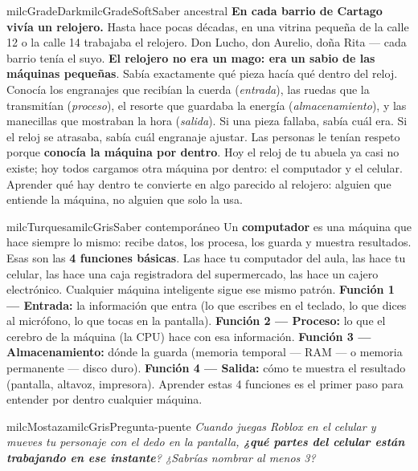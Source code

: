 \documentclass[11pt,letterpaper]{article}
\begin{document}
\begin{softbox}{milcGradeDark}{milcGradeSoft}{Saber ancestral}
\textbf{En cada barrio de Cartago vivía un relojero.} Hasta hace pocas décadas, en una vitrina pequeña de la calle 12 o la calle 14 trabajaba el relojero. Don Lucho, don Aurelio, doña Rita --- cada barrio tenía el suyo. \textbf{El relojero no era un mago: era un sabio de las máquinas pequeñas}. Sabía exactamente qué pieza hacía qué dentro del reloj. Conocía los engranajes que recibían la cuerda (\emph{entrada}), las ruedas que la transmitían (\emph{proceso}), el resorte que guardaba la energía (\emph{almacenamiento}), y las manecillas que mostraban la hora (\emph{salida}). Si una pieza fallaba, sabía cuál era. Si el reloj se atrasaba, sabía cuál engranaje ajustar. Las personas le tenían respeto porque \textbf{conocía la máquina por dentro}. Hoy el reloj de tu abuela ya casi no existe; hoy todos cargamos otra máquina por dentro: el computador y el celular. Aprender qué hay dentro te convierte en algo parecido al relojero: alguien que entiende la máquina, no alguien que solo la usa.
\end{softbox}

\begin{softbox}{milcTurquesa}{milcGris}{Saber contemporáneo}
Un \textbf{computador} es una máquina que hace siempre lo mismo: recibe datos, los procesa, los guarda y muestra resultados. Esas son las \textbf{4 funciones básicas}. Las hace tu computador del aula, las hace tu celular, las hace una caja registradora del supermercado, las hace un cajero electrónico. Cualquier máquina inteligente sigue ese mismo patrón. \textbf{Función 1 --- Entrada:} la información que entra (lo que escribes en el teclado, lo que dices al micrófono, lo que tocas en la pantalla). \textbf{Función 2 --- Proceso:} lo que el cerebro de la máquina (la CPU) hace con esa información. \textbf{Función 3 --- Almacenamiento:} dónde la guarda (memoria temporal --- RAM --- o memoria permanente --- disco duro). \textbf{Función 4 --- Salida:} cómo te muestra el resultado (pantalla, altavoz, impresora). Aprender estas 4 funciones es el primer paso para entender por dentro cualquier máquina.
\end{softbox}

\begin{softbox}{milcMostaza}{milcGris}{Pregunta-puente}
\textit{Cuando juegas Roblox en el celular y mueves tu personaje con el dedo en la pantalla, \textbf{¿qué partes del celular están trabajando en ese instante}? ¿Sabrías nombrar al menos 3?}
\end{softbox}
\end{document}
